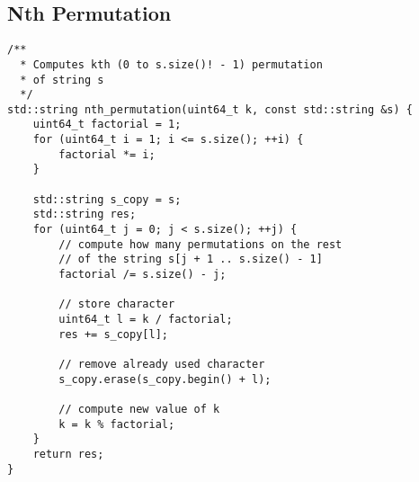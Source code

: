 \subsection{Nth Permutation}
\begin{verbatim}
/**
  * Computes kth (0 to s.size()! - 1) permutation
  * of string s
  */
std::string nth_permutation(uint64_t k, const std::string &s) {
    uint64_t factorial = 1;
    for (uint64_t i = 1; i <= s.size(); ++i) {
        factorial *= i;
    }

    std::string s_copy = s;
    std::string res;
    for (uint64_t j = 0; j < s.size(); ++j) {
        // compute how many permutations on the rest
        // of the string s[j + 1 .. s.size() - 1]
        factorial /= s.size() - j;
       
        // store character 
        uint64_t l = k / factorial;
        res += s_copy[l];

        // remove already used character
        s_copy.erase(s_copy.begin() + l);

        // compute new value of k
        k = k % factorial;
    }
    return res;
}
\end{verbatim}

